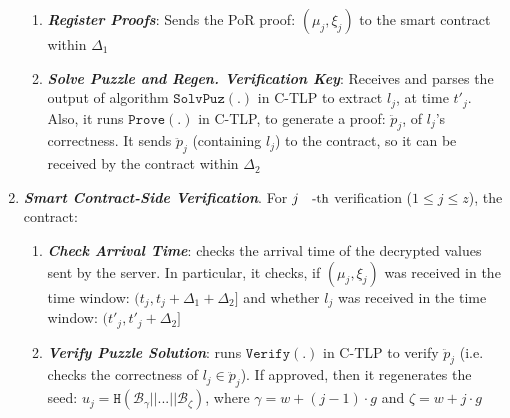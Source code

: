 \begin{enumerate}[leftmargin=.46cm]
\begin{enumerate}
 \item\label{Register-Proofs}\textbf{\textit{\small {Register Proofs}}}:  Sends the PoR proof: $(\mu_{\scriptscriptstyle j},\xi_{\scriptscriptstyle j})$   to the smart contract within  $\Delta_{\scriptscriptstyle1}$
 \item\label{fully-recover-l}\textbf{\textit{\small {Solve Puzzle and Regen.  Verification Key}}}: Receives and parses the output of algorithm $\mathtt{SolvPuz}(.)$ in C-TLP to extract $l_{\scriptscriptstyle j}$, at time $t'_{\scriptscriptstyle j}$. Also, it runs $\mathtt{Prove}(.)$ in C-TLP, to generate a proof: $\ddot{p}_{\scriptscriptstyle j}$, of $l_{\scriptscriptstyle j}$'s correctness. It sends $\ddot{p}_{\scriptscriptstyle j}$ (containing $l_{\scriptscriptstyle j}$)  to the contract, so it can be received by the contract within $\Delta_{\scriptscriptstyle 2}$ 
\end{enumerate}


\item \textit{\textbf{Smart Contract-Side Verification}}. For   $j\text{\small{-th}}$ verification  ($1\leq j\leq z$), the contract:



\begin{enumerate} 
\item\textbf{\textit{\small {Check Arrival Time}}}: checks the arrival time of the decrypted values sent by the server. In particular, it checks, if $(\mu_{\scriptscriptstyle j},\xi_{\scriptscriptstyle j})$ was received in the time window: $(t_{\scriptscriptstyle j}, t_{\scriptscriptstyle j}+\Delta_{\scriptscriptstyle 1}+\Delta_{\scriptscriptstyle 2}]$ and whether $l_{\scriptscriptstyle j}$ was received in the time window: $(t'_{\scriptscriptstyle j}, t'_{\scriptscriptstyle j}+\Delta_{\scriptscriptstyle 2}]$

\item\label{check-hash}\textbf{\textit{\small {Verify Puzzle Solution}}}: runs $\mathtt{Verify}(.)$ in C-TLP to verify $\ddot{p}_{\scriptscriptstyle j}$  (i.e. checks the correctness of $l_{\scriptscriptstyle j}\in \ddot{p}_{\scriptscriptstyle j}$). If approved, then it regenerates the seed:  $u_{\scriptscriptstyle j}=\mathtt{H}( \mathcal {B}_{\scriptscriptstyle \gamma}||...||  \mathcal {B}_{\scriptscriptstyle \zeta})$, where $\gamma=w+(j-1)\cdot g$ and $\zeta=w+j\cdot g$





\end{enumerate}
\end{enumerate}
